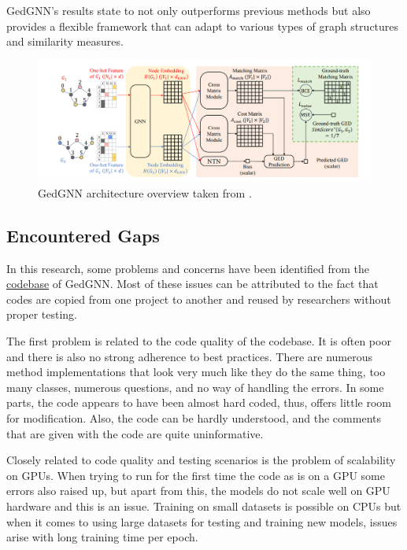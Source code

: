 \documentclass[../Thesis.tex]{subfiles}
\begin{document}
	GedGNN's results state to not only outperforms previous methods but also provides a flexible framework that can adapt to various types of graph structures and similarity measures.
	
	\begin{figure}[H]
		\centering
		\includegraphics[width=\textwidth]{Images/gedgnn_architecture.png}
		\caption{GedGNN architecture overview taken from \cite{computing_graph_edit_distance_via_neural_graph_matching}.}
		\label{fig:gedgnn_architecture}
	\end{figure}
	
	\subsection{Encountered Gaps}
	
	In this research, some problems and concerns have been identified from the \href{https://github.com/ChengzhiPiao/GEDGNN}{codebase} of GedGNN. Most of these issues can be attributed to the fact that codes are copied from one project to another and reused by researchers without proper testing.
	
	The first problem is related to the code quality of the codebase. It is often poor and there is also no strong adherence to best practices. There are numerous method implementations that look very much like they do the same thing, too many classes, numerous questions, and no way of handling the errors. In some parts, the code appears to have been almost hard coded, thus, offers little room for modification. Also, the code can be hardly understood, and the comments that are given with the code are quite uninformative.
	
	Closely related to code quality and testing scenarios is the problem of scalability on GPUs. When trying to run for the first time the code as is on a GPU some errors also raised up, but apart from this, the models do not scale well on GPU hardware and this is an issue. Training on small datasets is possible on CPUs but when it comes to using large datasets for testing and training new models, issues arise with long training time per epoch.
	
\end{document}
